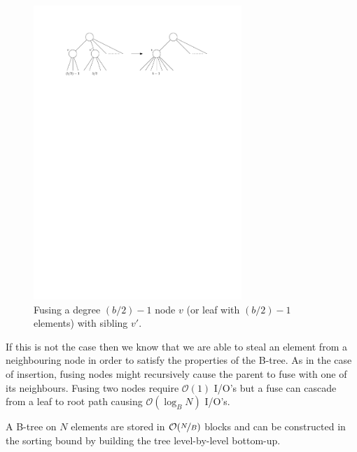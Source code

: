 \documentclass[twoside,11pt,openright]{report}
\begin{document}
\begin{figure}[H]
	\centering
	\includegraphics[width=0.7\textwidth]{../figures/b_tree_fuse}
	\caption{Fusing a degree $(b/2)-1$ node $v$ (or leaf with $(b/2)-1$ elements) with sibling $v'$.}
	\label{fig:b_tree_fuse}
\end{figure}

If this is not the case then we know that we are able to steal an element from a neighbouring node in order to satisfy the properties of the B-tree. As in the case of insertion, fusing nodes might recursively cause the parent to fuse with one of its neighbours.
Fusing two nodes require $\mathcal{O}(1)$ I/O's but a fuse can cascade from a leaf to root path causing $\mathcal{O}(\log_B N)$ I/O's.

A B-tree on $N$ elements are stored in $\mathcal{O}(\nicefrac{N}{B})$ blocks and can be constructed in the sorting bound by building the tree level-by-level bottom-up.
\end{document}
